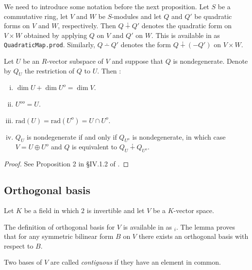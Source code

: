 We need to introduce some notation before the next proposition. Let $S$ be a commutative ring, let $V$ and $W$ be $S$-modules and let $Q$ and $Q'$ be quadratic forms on $V$ and $W$, respectively. Then $Q \dotplus Q'$ denotes the quadratic form on $V \times W$ obtained by applying $Q$ on $V$ and $Q'$ on $W$. This is available in \mathlib as \texttt{QuadraticMap.prod}. Similarly, $Q \dotminus Q'$ denotes the form $Q \dotplus (-Q')$ on $V \times W$.

\begin{proposition}\label{prop:ortho_compl_properties}
\leanok
{}
Let $U$ be an $R$-vector subspace of $V$ and suppose that $Q$ is nondegenerate. Denote by $Q_U$ the restriction of $Q$ to $U$. Then :
\begin{enumerate}[(i)]
\item $\dim U + \dim U^o = \dim V$.
\item $U^{oo} = U$.
\item $\text{rad}(U) = \text{rad}(U^o) = U \cap U^o$.
\item $Q_U$ is nondegenerate if and only if $Q_{U^o}$ is nondegenerate, in which case $V = U \oplus U^o$ and $Q$ is equivalent to $Q_U \dotplus Q_{U^o}$.
\end{enumerate}
\end{proposition}
\begin{proof}
\leanok
{}
See Proposition 2 in \S IV.1.2 of \cite{Ser73}.
\end{proof}

\subsection{Orthogonal basis}\label{subsec:ortho_basis}

Let $K$ be a field in which $2$ is invertible and let $V$ be a $K$-vector space.

The definition of orthogonal basis for $V$ is available in \mathlib as $_i$. The lemma  proves that for any symmetric bilinear form $B$ on $V$ there exists an orthogonal basis with respect to $B$.

\begin{definition}\label{def:contiguous}
\leanok
Two bases of $V$ are called \emph{contiguous} if they have an element in common.
\end{definition}

